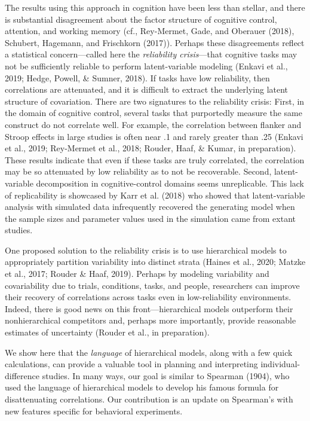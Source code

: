 \documentclass[
  ,man]{apa6}
\begin{document}
The results using this approach in cognition have been less than stellar, and there is substantial disagreement about the factor structure of cognitive control, attention, and working memory (cf., Rey-Mermet, Gade, and Oberauer (2018), Schubert, Hagemann, and Frischkorn (2017)). Perhaps these disagreements reflect a statistical concern---called here the \emph{reliability crisis}---that cognitive tasks may not be sufficiently reliable to perform latent-variable modeling (Enkavi et al., 2019; Hedge, Powell, \& Sumner, 2018). If tasks have low reliability, then correlations are attenuated, and it is difficult to extract the underlying latent structure of covariation. There are two signatures to the reliability crisis: First, in the domain of cognitive control, several tasks that purportedly measure the same construct do not correlate well. For example, the correlation between flanker and Stroop effects in large studies is often near .1 and rarely greater than .25 (Enkavi et al., 2019; Rey-Mermet et al., 2018; Rouder, Haaf, \& Kumar, in preparation). These results indicate that even if these tasks are truly correlated, the correlation may be so attenuated by low reliability as to not be recoverable. Second, latent-variable decomposition in cognitive-control domains seems unreplicable. This lack of replicability is showcased by Karr et al. (2018) who showed that latent-variable analysis with simulated data infrequently recovered the generating model when the sample sizes and parameter values used in the simulation came from extant studies.

One proposed solution to the reliability crisis is to use hierarchical models to appropriately partition variability into distinct strata (Haines et al., 2020; Matzke et al., 2017; Rouder \& Haaf, 2019). Perhaps by modeling variability and covariability due to trials, conditions, tasks, and people, researchers can improve their recovery of correlations across tasks even in low-reliability environments. Indeed, there is good news on this front---hierarchical models outperform their nonhierarchical competitors and, perhaps more importantly, provide reasonable estimates of uncertainty (Rouder et al., in preparation).

We show here that the \emph{language} of hierarchical models, along with a few quick calculations, can provide a valuable tool in planning and interpreting individual-difference studies. In many ways, our goal is similar to Spearman (1904), who used the language of hierarchical models to develop his famous formula for disattenuating correlations. Our contribution is an update on Spearman's with new features specific for behavioral experiments.
\end{document}
